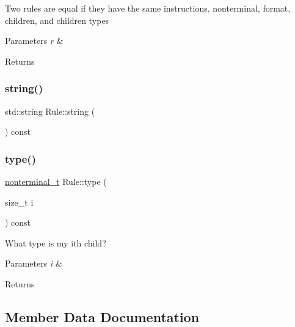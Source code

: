Two rules are equal if they have the same instructions, nonterminal, format, children, and children types 
\begin{DoxyParams}{Parameters}
{\em r} & \\
\hline
\end{DoxyParams}
\begin{DoxyReturn}{Returns}

\end{DoxyReturn}
\mbox{\label{class_rule_a7f16256eabd7bd8b94fbcf857bf1e45b}} 
\subsubsection{\texorpdfstring{string()}{string()}}
{\footnotesize\ttfamily std\+::string Rule\+::string (\begin{DoxyParamCaption}{ }\end{DoxyParamCaption}) const\hspace{0.3cm}{\ttfamily [inline]}}

\mbox{\label{class_rule_a97db8e22bb8445b92779eb165bb29ae5}} 
\subsubsection{\texorpdfstring{type()}{type()}}
{\footnotesize\ttfamily \hyperlink{_nonterminal_8h_a5c1f658dc7560600a16d22408bd716ca}{nonterminal\+\_\+t} Rule\+::type (\begin{DoxyParamCaption}\item[{size\+\_\+t}]{i }\end{DoxyParamCaption}) const\hspace{0.3cm}{\ttfamily [inline]}}

What type is my i\textquotesingle{}th child? 
\begin{DoxyParams}{Parameters}
{\em i} & \\
\hline
\end{DoxyParams}
\begin{DoxyReturn}{Returns}

\end{DoxyReturn}


\subsection{Member Data Documentation}
\mbox{\label{class_rule_ac29b59e23c3327fed7a1e99b06512057}} 
